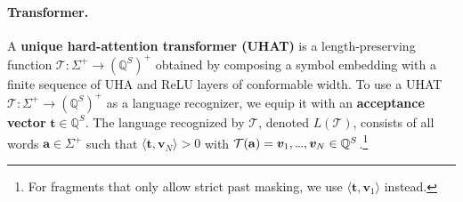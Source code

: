 \documentclass{article} %
\newcommand{\Q}{\mathbb{Q}}
\newcommand{\defn}[1]{\textbf{#1}}
\newcommand{\str}[1]{#1}
\newcommand{\alphabet}{\Sigma}
\newcommand{\bv}{\boldsymbol{v}}
\newcommand{\bword}{\mathbf{a}}
\newcommand{\trans}{\mathcal{T}}
\newcommand{\bt}{\boldsymbol{t}}
\newcommand{\Lang}{L}
\newcommand{\mydots}{%
  \ifmmode
    \mathord{.}\mkern-1mu\mathord{.}\mkern-1mu\mathord{.}%
  \else
    .\kern-0.1em.\kern-0.1em.%
  \fi
}
\renewcommand{\dots}{\mydots}%
\begin{document}
\paragraph{Transformer.}
A \defn{unique hard-attention transformer (UHAT)} is a
length-preserving function $\trans \colon \alphabet^+ \to (\Q^S)^+$
obtained by composing a symbol embedding with a finite sequence of UHA and
ReLU layers of conformable width.
To use a UHAT $\trans \colon \alphabet^+ \to (\Q^S)^+$ as a language recognizer, we equip it with an \defn{acceptance vector} $\bt \in \Q^S$. The language recognized by $\trans$, denoted $\Lang(\trans)$, consists of all words $\str{\bword} \in \alphabet^+$ such that  $\langle \bt, \bv_N \rangle > 0$ with $\trans(\str{\bword}) =\bv_1, \dots, \bv_N \in \Q^S$.\footnote{For fragments that only allow strict past masking, we use $\langle \bt, \bv_1 \rangle$ instead.}
\end{document}
